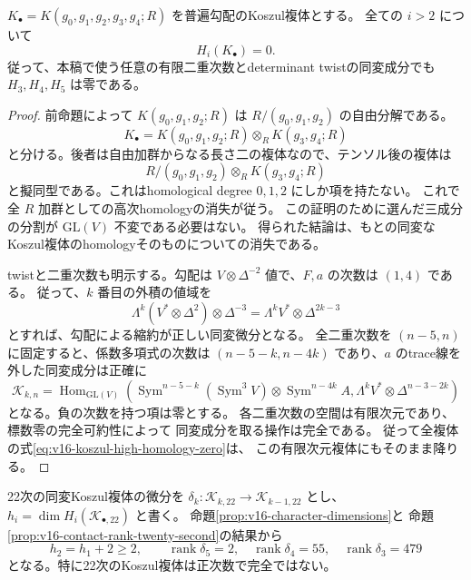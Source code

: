 \begin{theorem}[普遍Koszul複体の高いhomologyは消える]
\label{thm:v16-koszul-high-homology-vanishing}
$K_\bullet=K(g_0,g_1,g_2,g_3,g_4;R)$ を普遍勾配のKoszul複体とする。
全ての $i>2$ について
\begin{equation}\label{eq:v16-koszul-high-homology-zero}
 H_i(K_\bullet)=0.
\end{equation}
従って、本稿で使う任意の有限二重次数とdeterminant twistの同変成分でも
$H_3,H_4,H_5$ は零である。
\end{theorem}

\begin{proof}
前命題によって $K(g_0,g_1,g_2;R)$ は
$R/(g_0,g_1,g_2)$ の自由分解である。
\[
 K_\bullet=K(g_0,g_1,g_2;R)\otimes_R K(g_3,g_4;R)
\]
と分ける。後者は自由加群からなる長さ二の複体なので、テンソル後の複体は
\[
 R/(g_0,g_1,g_2)\otimes_R K(g_3,g_4;R)
\]
と擬同型である。これはhomological degree $0,1,2$ にしか項を持たない。
これで全 $R$ 加群としての高次homologyの消失が従う。
この証明のために選んだ三成分の分割が $\mathrm{GL}(V)$ 不変である必要はない。
得られた結論は、もとの同変なKoszul複体のhomologyそのものについての消失である。

twistと二重次数も明示する。勾配は
$V\otimes\Delta^{-2}$ 値で、$F,a$ の次数は $(1,4)$ である。
従って、$k$ 番目の外積の値域を
\[
 \Lambda^k(V^*\otimes\Delta^2)\otimes\Delta^{-3}
   =\Lambda^kV^*\otimes\Delta^{2k-3}
\]
とすれば、勾配による縮約が正しい同変微分となる。
全二重次数を $(n-5,n)$ に固定すると、係数多項式の次数は
$(n-5-k,n-4k)$ であり、$a$ のtrace線を外した同変成分は正確に
\[
 \mathcal K_{k,n}=\operatorname{Hom}_{\mathrm{GL}(V)}
 \left(\operatorname{Sym}^{n-5-k}(\operatorname{Sym}^3V)
 \otimes\operatorname{Sym}^{n-4k}A,
 \Lambda^kV^*\otimes\Delta^{n-3-2k}\right)
\]
となる。負の次数を持つ項は零とする。
各二重次数の空間は有限次元であり、標数零の完全可約性によって
同変成分を取る操作は完全である。
従って全複体の式\eqref{eq:v16-koszul-high-homology-zero}は、
この有限次元複体にもそのまま降りる。
\end{proof}

\begin{corollary}
\label{cor:v16-twentysecond-koszul-defect}
22次の同変Koszul複体の微分を
$\delta_k:\mathcal K_{k,22}\to\mathcal K_{k-1,22}$ とし、
$h_i=\dim H_i(\mathcal K_{\bullet,22})$ と書く。
命題\ref{prop:v16-character-dimensions}と
命題\ref{prop:v16-contact-rank-twenty-second}の結果から
\begin{equation}\label{eq:v16-twentysecond-koszul-defect}
 h_2=h_1+2\ge2,
 \qquad
 \operatorname{rank}\delta_5=2,
 \quad\operatorname{rank}\delta_4=55,
 \quad\operatorname{rank}\delta_3=479
\end{equation}
となる。特に22次のKoszul複体は正次数で完全ではない。
\end{corollary}

